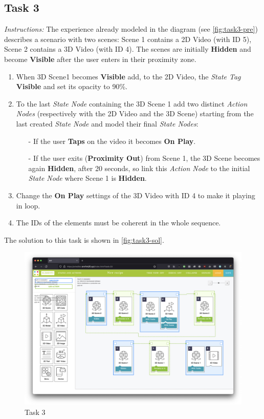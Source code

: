 \subsection*{Task 3}
\textit{Instructions:} 
The experience already modeled in the diagram (see \autoref{fig:task3-pre}) describes a scenario with two scenes:
Scene 1 contains a 2D Video (with ID 5), Scene 2 contains a 3D Video (with ID 4).
The scenes are initially \textbf{Hidden} and become \textbf{Visible} after the user enters in their proximity zone.
\begin{enumerate}
    \item When 3D Scene1 becomes \textbf{Visible} add, to the 2D Video, the \textit{State Tag} \textbf{Visible} and set its opacity to 90\%.
    \item To the last \textit{State Node} containing the 3D Scene 1 add two distinct \textit{Action Nodes} (respectively with the 2D Video and the 3D Scene) starting from the last created \textit{State Node} and model their final \textit{State Nodes}:
        \begin{itemize}
            \item[-]If the user \textbf{Taps} on the video it becomes \textbf{On Play}.
            \item[-]If the user exits (\textbf{Proximity Out}) from Scene 1, the 3D Scene becomes again \textbf{Hidden}, after 20 seconds, so link this \textit{Action Node} to the initial \textit{State Node} where Scene 1 is \textbf{Hidden}.
        \end{itemize}
    \item Change the \textbf{On Play} settings of the 3D Video with ID 4 to make it playing in loop.
    \item The IDs of the elements must be coherent in the whole sequence.
\end{enumerate}
The solution to this task is shown in \autoref{fig:task3-sol}.
\begin{figure}[h]
    \centering
    \includegraphics[width=\linewidth]{Figures/Evaluation/Tasks/task3-pre.png}
    \caption{Task 3}
    \label{fig:task3-pre}
\end{figure}

